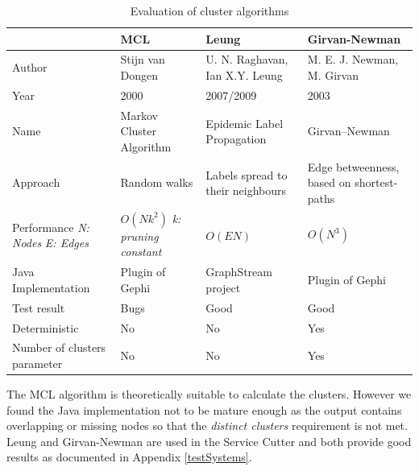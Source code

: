 \begin{table}[H]
	\centering
	\caption{Evaluation of cluster algorithms}
	\label{tab:clusterAlgorithms}
	\begin{tabular}{|p{2.2cm}|p{4cm}|p{4cm}|p{4cm}|}
		\hline
		& \textbf{MCL}               & \textbf{Leung}                    & \textbf{Girvan-Newman}  \\ \hline
		Author              & Stijn van Dongen\cite{markovCluster} & U. N. Raghavan\cite{raghavan}, Ian X.Y. Leung\cite{leung}    & M. E. J. Newman, M. Girvan\cite{girvan} \\ \hline
		Year                & 2000                       & 2007/2009                         & \multicolumn{1}{l|}{2003}                       \\ \hline
		Name                & Markov Cluster Algorithm   & Epidemic Label Propagation        & \multicolumn{1}{l|}{Girvan–Newman}              \\ \hline
		Approach            & Random walks               & Labels spread to their neighbours & Edge betweenness, based on shortest-paths       \\ \hline
		Performance \newline \textit{N: Nodes} \newline \textit{E: Edges}         & $O (N k^2)$ \newline \textit{k: pruning constant} \cite[p.126]{markovCluster} & $O( E N )$ \cite[p.3]{leung}                         & $O ( N^3 )$\cite[p.14]{girvan}       \\ \hline
		Java Implementation & Plugin of Gephi\cite{gephiMarkov} & GraphStream project\cite{leungGraphstream} & Plugin of Gephi\cite{gephiMarkov} \\ \hline
		Test result         & Bugs                       & Good                              & \multicolumn{1}{l|}{Good}                       \\ \hline
		Deterministic & No & No & Yes \\
		\hline
		Number of clusters parameter & No & No & Yes \\
		\hline
	\end{tabular}
\end{table}

The \gls{MCL} algorithm is theoretically suitable to calculate the clusters. However we found the Java implementation not to be mature enough as the output contains overlapping or missing nodes so that the \textit{distinct clusters} requirement is not met. Leung and Girvan-Newman are used in the Service Cutter and both provide good results as documented in Appendix \ref{testSystems}.

